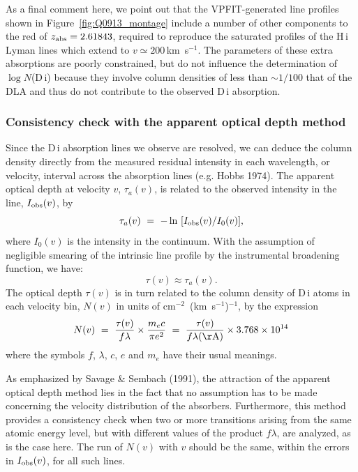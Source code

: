 \documentclass[useAMS,usenatbib]{mn2e}
\begin{document}
As a final comment here, we point out that the VPFIT-generated
line profiles shown
in Figure~\ref{fig:Q0913_montage}
include a number of other components to the red of
$z_{\rm abs} = 2.61843$, required to
reproduce the saturated profiles of the H\,{\sc i} Lyman
lines which extend to $v \simeq 200$\,km~s$^{-1}$.
The parameters of these extra absorptions are poorly
constrained, but do not influence the determination
of $\log N$(D\,{\sc i}) because they involve column
densities of less than $\sim 1/100$ that of the DLA and thus
do not contribute to the observed D\,{\sc i} absorption.

\subsubsection{Consistency check with the apparent optical depth method}
Since the D\,{\sc i} absorption lines we observe are resolved,
we can deduce the column density directly from the measured
residual intensity in each wavelength, or velocity, interval across
the absorption lines (e.g. Hobbs 1974).
The apparent optical depth at velocity $v$, $\tau_a(v)$, 
is related to the observed intensity
in the line, $I_{\rm obs}(v)$, by
\begin{equation}
\tau_a(v) ~=~ -\ln~ [I_{\rm obs}(v)/I_0(v)] ,
\label{eq:tau}
\end{equation}
where $I_0(v)$ is the intensity in the continuum.
With the assumption of negligible smearing of the 
intrinsic line profile by the 
instrumental broadening function, we have:
\begin{equation}
\tau(v) \approx \tau_a(v) .
\end{equation}
The optical depth $\tau(v)$ is in turn related to the column density
of D\,{\sc i} atoms in each velocity bin,  
$N (v)$ in units of cm$^{-2}$~(km~s$^{-1}$)$^{-1}$, 
by the expression
\begin{equation}
N (v) ~=~ \frac{\tau(v)}{f\lambda} \times \frac{m_e c}{\pi e^2} 
~=~  \frac{\tau(v)}{f\lambda{\rm (\AA)}} \times 3.768 \times 10^{14}
\label{eq:N_optical_depth1}
\end{equation}
where the symbols $f$, $\lambda$, $c$, $e$ and $m_e$ have their usual
meanings.

As emphasized by Savage \& Sembach (1991),
the attraction of the apparent optical depth method
lies in the fact that no assumption has to be made
concerning the velocity distribution of the absorbers.
Furthermore, this method provides a consistency check when 
two or more transitions arising from the same atomic energy level,
but with different values of the product $f \lambda$, 
are analyzed, as is the case here.
The run of $N(v)$ with $v$ should be the same, within the errors
in $I_{\rm obs}(v)$, for all such lines.
\end{document}
